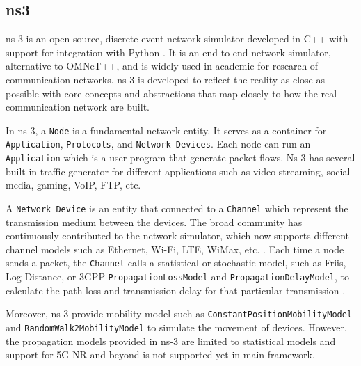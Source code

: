 \subsection{ns3}
ns-3 is an open-source, discrete-event network simulator developed in C++ with support for integration with Python \cite{ns3}.
It is an end-to-end network simulator, alternative to OMNeT++, and is widely used in academic for research of communication networks.
ns-3 is developed to reflect the reality as close as possible with core concepts and abstractions that map closely to how the real communication network are built.

In ns-3, a \texttt{Node} is a fundamental network entity. It serves as a container for \texttt{Application}, \texttt{Protocols}, and \texttt{Network Devices}.
Each node can run an \texttt{Application} which is a user program that generate packet flows.
Ns-3 has several built-in traffic generator for different applications such as video streaming, social media, gaming, VoIP, FTP, etc.

A \texttt{Network Device} is an entity that connected to a \texttt{Channel} which represent the transmission medium between the devices.
The broad community has continuously contributed to the network simulator, which now supports different channel models such as Ethernet, Wi-Fi, LTE, WiMax, etc. \cite{ns3}.
Each time a node sends a packet, the \texttt{Channel} calls a statistical or stochastic model, such as Friis, Log-Distance, or 3GPP \texttt{Propagation\allowbreak LossModel} and \texttt{Propagation\allowbreak DelayModel}, to calculate the path loss and transmission delay for that particular transmission \cite{ns3,tr38901}.

Moreover, ns-3 provide mobility model such as \texttt{ConstantPositionMobilityModel} and \texttt{RandomWalk2MobilityModel} to simulate the movement of devices.
However, the propagation models provided in ns-3 are limited to statistical models and support for 5G NR and beyond is not supported yet in main framework.
